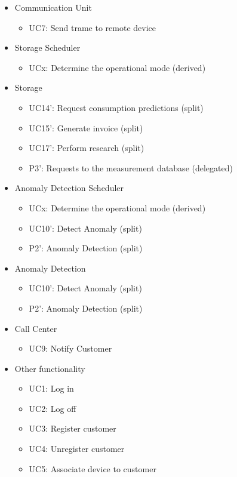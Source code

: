 \begin{itemize}
	\item Communication Unit
	\begin{itemize}
		\item UC7: Send trame to remote device
	\end{itemize}
	\item Storage Scheduler
	\begin{itemize}
		\item UCx: Determine the operational mode (derived)
	\end{itemize}
	\item Storage
	\begin{itemize}
		\item UC14': Request consumption predictions (split)
	  	\item UC15': Generate invoice (split)
	  	\item UC17': Perform research (split)
	  	\item P3': Requests to the measurement database (delegated)
	\end{itemize}
	\item Anomaly Detection Scheduler
	\begin{itemize}
		\item UCx: Determine the operational mode (derived)
	  	\item UC10': Detect Anomaly (split)
	  	\item P2': Anomaly Detection (split)
	\end{itemize}
	\item Anomaly Detection
	\begin{itemize}
		\item UC10': Detect Anomaly (split)
		\item P2': Anomaly Detection (split)
	\end{itemize}
	\item Call Center
	\begin{itemize}
		\item UC9: Notify Customer
	\end{itemize}
	\item Other functionality
	\begin{itemize}
	  	\item UC1: Log in
	  	\item UC2: Log off
	  	\item UC3: Register customer
	  	\item UC4: Unregister customer
	  	\item UC5: Associate device to customer

\end{itemize}
\end{itemize}
